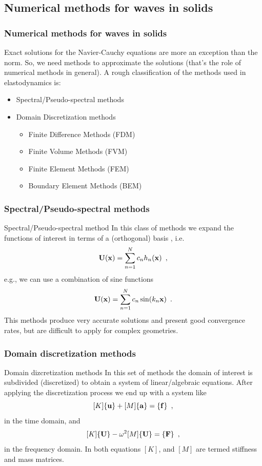 \documentclass{beamer}
\begin{document}
\subsection{Numerical methods for waves in solids}
\begin{frame}
\frametitle{Numerical methods for waves in solids}
Exact solutions for the Navier-Cauchy equations are more an exception than the norm. So, we need methods to approximate the solutions (that's the role of numerical methods in general). A rough classification of the methods used in elastodynamics is:
\begin{itemize}
\item Spectral/Pseudo-spectral methods
\item Domain Discretization methods
\begin{itemize}
\item Finite Difference Methods (FDM)
\item Finite Volume Methods (FVM)
\item Finite Element Methods (FEM)
\item Boundary Element Methods (BEM)
\end{itemize}
\end{itemize}
\end{frame}

\subsubsection{Spectral/Pseudo-spectral methods}
\begin{frame}{Spectral/Pseudo-spectral method}
In this class of methods we expand the functions of interest in terms of a (orthogonal) basis \cite{wiki:pseudo_spectral}, i.e.
\[\bold{U}(\bold{x}) = \sum\limits_{n=1}^N c_n h_n(\bold{x}) \enspace ,\]
e.g., we can use a combination of sine functions
\[\bold{U}(\bold{x}) = \sum\limits_{n=1}^N c_n \sin(k_n\bold{x}) \enspace .\]
This methods produce very accurate solutions and present good convergence rates, but are difficult to apply for complex geometries.
\end{frame}

\subsubsection{Domain discretization methods}
\begin{frame}{Domain dizcretization methods}
In this set of methods the domain of interest is subdivided (discretized) to obtain a system of linear/algebraic equations. After applying the discretization process we end up with a system like
\[[K]\lbrace \bold{u}\rbrace + [M]\lbrace \bold{a}\rbrace = \lbrace \bold{f}\rbrace \enspace ,\]
in the time domain, and
\[[K]\lbrace \bold{U}\rbrace - \omega^2 [M]\lbrace \bold{U}\rbrace = \lbrace \bold{F}\rbrace \enspace ,\]
in the frequency domain. In both equations $[K]$,  and $[M]$ are termed stiffness and mass matrices.

\end{frame}
\end{document}

